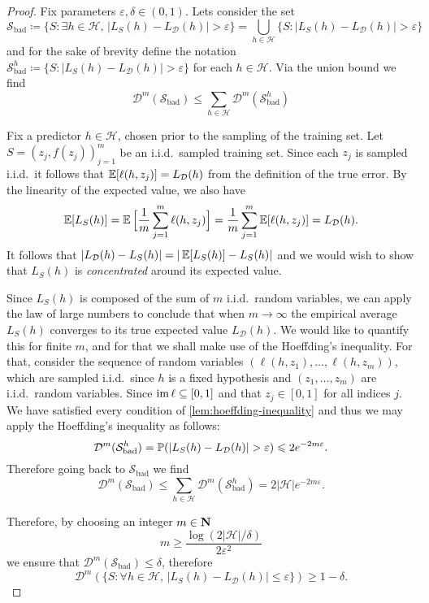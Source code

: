 \begin{proof}
Fix parameters \(\varepsilon, \delta \in (0, 1)\). Lets consider the set
\[
\mathcal{S}_{\text{bad}} \coloneq
\{S \colon \exists h \in \mathcal{H},\, |L_S(h) - L_{\mathcal{D}}(h)| > \varepsilon\}
= \bigcup_{h \in \mathcal{H}} \{S \colon |L_S(h) - L_{\mathcal{D}}(h)| > \varepsilon\}
\]
and for the sake of brevity define the notation
\(\mathcal{S}_{\text{bad}}^h \coloneq \{S \colon |L_S(h) - L_{\mathcal{D}}(h)| >
\varepsilon\}\) for each \(h \in \mathcal{H}\). Via the union bound we find
\[
\mathcal{D}^m(\mathcal{S}_{\text{bad}})
\leq \sum_{h \in \mathcal{H}} \mathcal{D}^m(\mathcal{S}_{\text{bad}}^h)
\]

Fix a predictor \(h \in \mathcal{H}\), chosen prior to the sampling of the
training set. Let \(S = (z_j, f(z_j))_{j=1}^m\) be an i.i.d.~sampled training
set. Since each \(z_j\) is sampled i.i.d.~it follows that
\(\operatorname{\mathbb{E}}[\ell(h, z_j)] = L_{\mathcal{D}}(h)\) from the definition of the true
error. By the linearity of the expected value, we also have
\[
\operatorname{\mathbb{E}}[L_S(h)] = \operatorname{\mathbb{E}}\Big[ \frac{1}{m} \sum_{j=1}^m \ell(h, z_j) \Big]
= \frac{1}{m} \sum_{j=1}^m \operatorname{\mathbb{E}}[\ell(h, z_j)]
=  L_{\mathcal{D}}(h).
\]
It follows that \(|L_{\mathcal{D}}(h) - L_S(h)| = |\operatorname{\mathbb{E}}[L_S(h)] - L_S(h)|\)
and we would wish to show that \(L_S(h)\) is \emph{concentrated} around its
expected value.

Since \(L_S(h)\) is composed of the sum of \(m\) i.i.d.~random variables, we can
apply the law of large numbers to conclude that when \(m \to \infty\) the
empirical average \(L_S(h)\) converges to its true expected value
\(L_{\mathcal{D}}(h)\). We would like to quantify this for finite \(m\), and for
that we shall make use of the Hoeffding's inequality. For that, consider the
sequence of random variables \((\ell(h, z_1), \dots, \ell(h, z_m))\), which are
sampled i.i.d.~since \(h\) is a fixed hypothesis and \((z_1, \dots, z_m)\) are
i.i.d.~random variables. Since \(\operatorname{im} \ell \subseteq [0, 1]\) and that
\(z_j \in [0, 1]\) for all indices \(j\). We have satisfied every condition of
\cref{lem:hoeffding-inequality} and thus we may apply the Hoeffding's inequality
as follows:
\[
\mathcal{D}^m(\mathcal{S}_{\text{bad}}^h)
= \operatorname{\mathbb{P}}(|L_S(h) - L_{\mathcal{D}}(h)| > \varepsilon)
\leqslant 2 e^{-2 m \varepsilon}.
\]
Therefore going back to \(\mathcal{S}_{\text{bad}}\) we find
\[
\mathcal{D}^m(\mathcal{S}_{\text{bad}})
\leq \sum_{h \in \mathcal{H}} \mathcal{D}^m(\mathcal{S}_{\text{bad}}^{h})
= 2 |\mathcal{H}| e^{-2 m \varepsilon}.
\]

Therefore, by choosing an integer \(m \in \mathbf{N}\)
\[
m \geq \frac{\log(2 |\mathcal{H}| / \delta)}{2 \varepsilon^2}
\]
we ensure that \(\mathcal{D}^m(\mathcal{S}_{\text{bad}}) \leq \delta\),
therefore
\[
\mathcal{D}^m(\{S \colon \forall h \in \mathcal{H},\,
|L_S(h) - L_{\mathcal{D}}(h)| \leq \varepsilon\}) \geq 1 - \delta.
\]
\end{proof}

